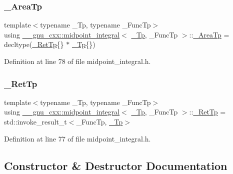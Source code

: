 \subsubsection{\texorpdfstring{\+\_\+\+Area\+Tp}{\_AreaTp}}
{\footnotesize\ttfamily template$<$typename \+\_\+\+Tp, typename \+\_\+\+Func\+Tp$>$ \\
using \hyperlink{class____gnu__cxx_1_1midpoint__integral}{\+\_\+\+\_\+gnu\+\_\+cxx\+::midpoint\+\_\+integral}$<$ \hyperlink{namespace____gnu__cxx_a3b19a9c800ca194374ef9172290f7d79}{\+\_\+\+Tp}, \+\_\+\+Func\+Tp $>$\+::\hyperlink{class____gnu__cxx_1_1midpoint__integral_a43cd31237c2257dd657a2a84fd33dd69}{\+\_\+\+Area\+Tp} =  decltype(\hyperlink{class____gnu__cxx_1_1midpoint__integral_a9d6b6a3d38d137c3cc9f832a4f5da59f}{\+\_\+\+Ret\+Tp}\{\} $\ast$ \hyperlink{namespace____gnu__cxx_a3b19a9c800ca194374ef9172290f7d79}{\+\_\+\+Tp}\{\})}



Definition at line 78 of file midpoint\+\_\+integral.\+h.

\mbox{\label{class____gnu__cxx_1_1midpoint__integral_a9d6b6a3d38d137c3cc9f832a4f5da59f}} 
\subsubsection{\texorpdfstring{\+\_\+\+Ret\+Tp}{\_RetTp}}
{\footnotesize\ttfamily template$<$typename \+\_\+\+Tp, typename \+\_\+\+Func\+Tp$>$ \\
using \hyperlink{class____gnu__cxx_1_1midpoint__integral}{\+\_\+\+\_\+gnu\+\_\+cxx\+::midpoint\+\_\+integral}$<$ \hyperlink{namespace____gnu__cxx_a3b19a9c800ca194374ef9172290f7d79}{\+\_\+\+Tp}, \+\_\+\+Func\+Tp $>$\+::\hyperlink{class____gnu__cxx_1_1midpoint__integral_a9d6b6a3d38d137c3cc9f832a4f5da59f}{\+\_\+\+Ret\+Tp} =  std\+::invoke\+\_\+result\+\_\+t$<$\+\_\+\+Func\+Tp, \hyperlink{namespace____gnu__cxx_a3b19a9c800ca194374ef9172290f7d79}{\+\_\+\+Tp}$>$}



Definition at line 77 of file midpoint\+\_\+integral.\+h.



\subsection{Constructor \& Destructor Documentation}
\mbox{\label{class____gnu__cxx_1_1midpoint__integral_ab62eec15eb135eb9027724a5367c89b9}} 
